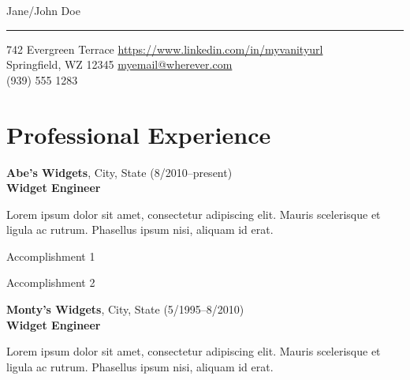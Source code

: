 \documentclass[11pt, letterpaper]{article}
\begin{document}

\begin{center}
{\LARGE Jane/John Doe}
\end{center}

\hrule

\vspace{.1in}

742 Evergreen Terrace \hfill \href{https://www.linkedin.com/in/yourvanityurl}{https://www.linkedin.com/in/myvanityurl} \\
Springfield, WZ 12345   \hfill \href{mailto:myemail@wherever.com}{myemail@wherever.com}\\
(939) 555 1283

\section*{Professional Experience}

\textbf{Abe's Widgets}, City, State \hfill (8/2010--present)\\
\textbf{Widget Engineer}

Lorem ipsum dolor sit amet, consectetur adipiscing elit. Mauris scelerisque et ligula ac rutrum. Phasellus ipsum nisi, aliquam id erat. 

\vspace{-.1in}

\begin{itemize*}
\item Accomplishment 1
\item Accomplishment 2
\end{itemize*}

\vspace{-.1in}

\textbf{Monty's Widgets}, City, State \hfill (5/1995--8/2010)\\
\textbf{Widget Engineer}

Lorem ipsum dolor sit amet, consectetur adipiscing elit. Mauris scelerisque et ligula ac rutrum. Phasellus ipsum nisi, aliquam id erat. 
\end{document}
